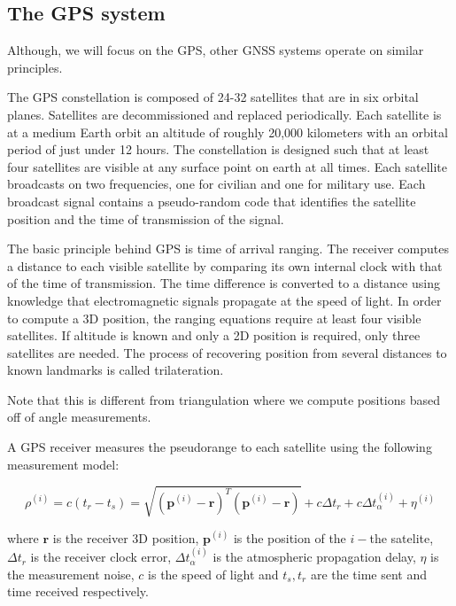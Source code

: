 \subsection{The GPS system} 

Although, we will focus on the GPS, other GNSS systems
operate on similar principles. 


The GPS constellation is composed of 24-32 satellites that are
in six orbital planes. Satellites are decommissioned
and replaced periodically. Each satellite is at a medium Earth
orbit an altitude of roughly 20,000 kilometers with an orbital period
of just under 12 hours. The constellation is designed such
that at least four satellites are visible at any surface point
on earth at all times. Each satellite broadcasts
on two frequencies, one for civilian and
one for military use. Each broadcast signal contains
a pseudo-random code that identifies the satellite position and the time of transmission of the signal. 

The basic principle behind GPS is time of arrival ranging. The receiver computes a distance
to each visible satellite by comparing its own internal clock with
that of the time of transmission. The time difference is converted
to a distance using knowledge that electromagnetic signals
propagate at the speed of light. In order to compute a 3D position, the ranging equations require
at least four visible satellites. If altitude is known and
only a 2D position is required, only three satellites are needed. The process of recovering position
from several distances to known landmarks is called trilateration. 


\begin{framed}
\theoremstyle{remark}
\begin{remark}{}

Note that this is different
from triangulation where we compute positions based
off of angle measurements. 
\end{remark}
\end{framed}


A GPS receiver measures the pseudorange
to each satellite using the following measurement model: 

\begin{equation}
\rho^{(i)} =  c (t_r - t_s) = \sqrt{(\mathbf{p}^{(i)} - \mathbf{r})^T(\mathbf{p}^{(i)} - \mathbf{r})} + c \Delta t_r + c\Delta t_{\alpha}^{(i)} + \eta^{(i)}
\end{equation}

where $\mathbf{r}$ is the receiver 3D position, $\mathbf{p}^{(i)}$ is the position of the $i-$the satelite, $\Delta t_r$ is the receiver clock error, 
$\Delta t_{\alpha}^{(i)}$ is the atmospheric propagation delay, $\eta$ is the measurement noise, $c$ is the speed of light and $t_s, t_r$ are the time sent and time received respectively.


